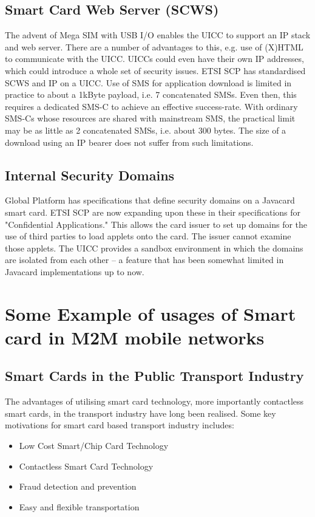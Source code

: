 \documentclass[12pt]{article}
\begin{document}
\subsection{Smart Card Web Server (SCWS)}
The advent of Mega SIM with USB I/O enables the UICC to support an IP stack and web server. There are a number of advantages to this, e.g. use of (X)HTML to communicate with the UICC. UICCs could even have their own IP addresses, which could introduce a whole set of security issues. ETSI SCP has standardised SCWS and IP on a UICC. Use of SMS for application download is limited in practice to about a 1kByte payload, i.e. 7 concatenated SMSs. Even then, this requires a dedicated SMS-C to achieve an effective success-rate. With ordinary SMS-Cs whose resources are shared with mainstream SMS, the practical limit may be as little as 2 concatenated SMSs, i.e. about 300 bytes. The size of a download using an IP bearer does not suffer from such limitations.

\subsection{Internal Security Domains}
Global Platform has specifications that define security domains on a Javacard smart card. ETSI SCP are now expanding upon these in their specifications for "Confidential Applications." This allows the card issuer to set up domains for the use of third parties to load applets onto the card. The issuer cannot examine those applets. The UICC provides a sandbox environment in which the domains are isolated from each other – a feature that has been somewhat limited in Javacard implementations up to now.

\section{Some Example of usages of Smart card in M2M mobile networks}
\subsection{Smart Cards in the Public Transport Industry}
The advantages of utilising smart card technology,
more importantly contactless smart cards, in the
transport industry have long been realised. Some key motivations for smart card based transport industry includes:
\begin{itemize}
\item Low Cost Smart/Chip Card Technology
\item Contactless Smart Card Technology
\item Fraud detection and prevention
\item Easy and flexible transportation
\end{itemize}
\end{document}
